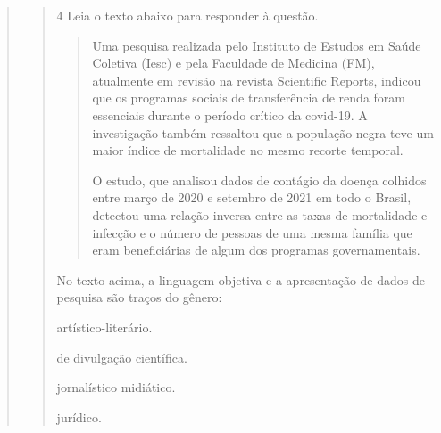 \begin{quote}
\begin{quote}
\num{4} Leia o texto abaixo para responder à questão.

\begin{quote}

Uma pesquisa realizada pelo Instituto de Estudos em Saúde Coletiva
(Iesc) e pela Faculdade de Medicina (FM), atualmente em revisão na
revista Scientific Reports, indicou que os programas sociais de
transferência de renda foram essenciais durante o período crítico da
covid-19. A investigação também ressaltou que a população negra teve um
maior índice de mortalidade no mesmo recorte temporal.

O estudo, que analisou dados de contágio da doença colhidos entre março
de 2020 e setembro de 2021 em todo o Brasil, detectou uma relação
inversa entre as taxas de mortalidade e infecção e o número de pessoas
de uma mesma família que eram beneficiárias de algum dos programas
governamentais.

\end{quote}


No texto acima, a linguagem objetiva e a apresentação de dados de pesquisa são traços do 
gênero:

\begin{escolha}

    \item artístico-literário.

    \item de divulgação científica.

    \item jornalístico midiático.

    \item jurídico.

\end{escolha}



\end{quote}
\end{quote}
